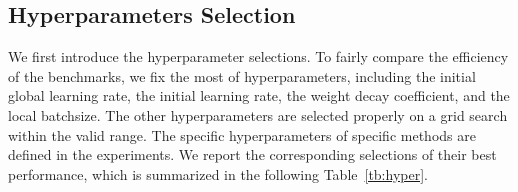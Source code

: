 \subsection{Hyperparameters Selection}
We first introduce the hyperparameter selections. To fairly compare the efficiency of the benchmarks, we fix the most of hyperparameters, including the initial global learning rate, the initial learning rate, the weight decay coefficient, and the local batchsize. The other hyperparameters are selected properly on a grid search within the valid range. The specific hyperparameters of specific methods are defined in the experiments. We report the corresponding selections of their best performance, which is summarized in the following Table~\ref{tb:hyper}.

\begin{table}[h]
\centering
\vspace{-0.2cm}
\caption{Hyperparameters selections of benchmarks.}
\small
\label{tb:hyper}
\end{table}

